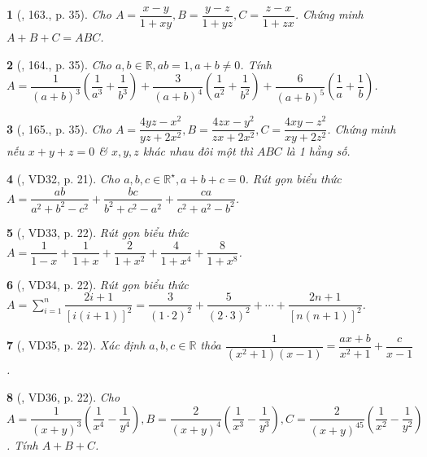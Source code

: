 \documentclass{article}
\newtheorem{baitoan}{}
\begin{document}
\begin{baitoan}[\cite{Tuyen_Toan_8}, 163., p. 35]
	Cho $A = \dfrac{x - y}{1 + xy},B = \dfrac{y - z}{1 + yz},C = \dfrac{z - x}{1 + zx}$. Chứng minh $A + B + C = ABC$.
\end{baitoan}

\begin{baitoan}[\cite{Tuyen_Toan_8}, 164., p. 35]
	Cho $a,b\in\mathbb{R},ab = 1,a + b\ne0$. Tính $A = \dfrac{1}{(a + b)^3}\left(\dfrac{1}{a^3} + \dfrac{1}{b^3}\right) + \dfrac{3}{(a + b)^4}\left(\dfrac{1}{a^2} + \dfrac{1}{b^2}\right) + \dfrac{6}{(a + b)^5}\left(\dfrac{1}{a} + \dfrac{1}{b}\right)$.
\end{baitoan}

\begin{baitoan}[\cite{Tuyen_Toan_8}, 165., p. 35]
	Cho $A = \dfrac{4yz - x^2}{yz + 2x^2},B = \dfrac{4zx - y^2}{zx + 2x^2},C = \dfrac{4xy - z^2}{xy + 2z^2}$. Chứng minh nếu $x + y + z = 0$ \& $x,y,z$ khác nhau đôi một thì $ABC$ là 1 hằng số.
\end{baitoan}

\begin{baitoan}[\cite{Binh_Toan_8_tap_1}, VD32, p. 21]
	Cho $a,b,c\in\mathbb{R}^\star,a + b + c = 0$. Rút gọn biểu thức $A = \dfrac{ab}{a^2 + b^2 - c^2} + \dfrac{bc}{b^2 + c^2 - a^2} + \dfrac{ca}{c^2 + a^2 - b^2}$.
\end{baitoan}

\begin{baitoan}[\cite{Binh_Toan_8_tap_1}, VD33, p. 22]
	Rút gọn biểu thức $A = \dfrac{1}{1 - x} + \dfrac{1}{1 + x} + \dfrac{2}{1 + x^2} + \dfrac{4}{1 + x^4} + \dfrac{8}{1 + x^8}$.
\end{baitoan}

\begin{baitoan}[\cite{Binh_Toan_8_tap_1}, VD34, p. 22]
	Rút gọn biểu thức $A = \sum_{i=1}^n \dfrac{2i + 1}{[i(i + 1)]^2} = \dfrac{3}{(1\cdot2)^2} + \dfrac{5}{(2\cdot3)^2} + \cdots + \dfrac{2n + 1}{[n(n + 1)]^2}$.
\end{baitoan}

\begin{baitoan}[\cite{Binh_Toan_8_tap_1}, VD35, p. 22]
	Xác định $a,b,c\in\mathbb{R}$ thỏa $\dfrac{1}{(x^2 + 1)(x - 1)} = \dfrac{ax + b}{x^2 + 1} + \dfrac{c}{x - 1}$.
\end{baitoan}

\begin{baitoan}[\cite{Binh_Toan_8_tap_1}, VD36, p. 22]
	Cho $A = \dfrac{1}{(x + y)^3}\left(\dfrac{1}{x^4} - \dfrac{1}{y^4}\right),B = \dfrac{2}{(x + y)^4}\left(\dfrac{1}{x^3} - \dfrac{1}{y^3}\right),C = \dfrac{2}{(x + y)^45}\left(\dfrac{1}{x^2} - \dfrac{1}{y^2}\right)$. Tính $A + B + C$.
\end{baitoan}
\end{document}
